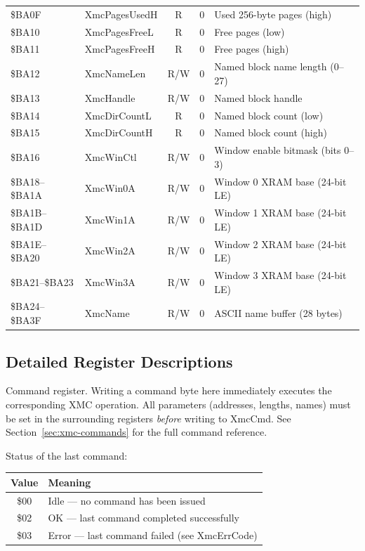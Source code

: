 \begin{center}
\begin{longtable}{@{}llcll@{}}
\$BA0F & XmcPagesUsedH & R  & 0    & Used 256-byte pages (high) \\
\$BA10 & XmcPagesFreeL & R  & 0    & Free pages (low) \\
\$BA11 & XmcPagesFreeH & R  & 0    & Free pages (high) \\
\$BA12 & XmcNameLen   & R/W & 0    & Named block name length (0--27) \\
\$BA13 & XmcHandle    & R/W & 0    & Named block handle \\
\$BA14 & XmcDirCountL & R   & 0    & Named block count (low) \\
\$BA15 & XmcDirCountH & R   & 0    & Named block count (high) \\
\$BA16 & XmcWinCtl    & R/W & 0    & Window enable bitmask (bits 0--3) \\
\$BA18--\$BA1A & XmcWin0A & R/W & 0 & Window 0 XRAM base (24-bit LE) \\
\$BA1B--\$BA1D & XmcWin1A & R/W & 0 & Window 1 XRAM base (24-bit LE) \\
\$BA1E--\$BA20 & XmcWin2A & R/W & 0 & Window 2 XRAM base (24-bit LE) \\
\$BA21--\$BA23 & XmcWin3A & R/W & 0 & Window 3 XRAM base (24-bit LE) \\
\$BA24--\$BA3F & XmcName  & R/W & 0 & ASCII name buffer (28 bytes) \\
\bottomrule
\end{longtable}
\end{center}


\subsection{Detailed Register Descriptions}



Command register.  Writing a command byte here immediately executes the
corresponding XMC operation.  All parameters (addresses, lengths, names)
must be set in the surrounding registers \emph{before} writing to XmcCmd.
See Section~\ref{sec:xmc-commands} for the full command reference.



Status of the last command:

\begin{center}
\small
\begin{tabular}{@{}cl@{}}
\toprule
\textbf{Value} & \textbf{Meaning} \\
\midrule
\$00 & Idle --- no command has been issued \\
\$02 & OK --- last command completed successfully \\
\$03 & Error --- last command failed (see XmcErrCode) \\
\bottomrule
\end{tabular}
\end{center}

